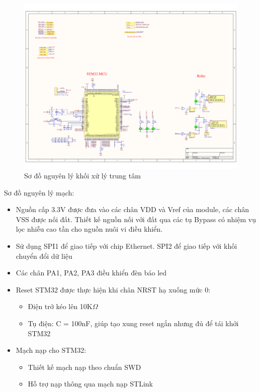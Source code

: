 \begin{figure}[!ht]
    \centering
    \includegraphics[width=1.0\linewidth]{Figures/Chap3_STM32-principle.pdf}
    \caption{Sơ đồ nguyên lý khối xử lý trung tâm}
    \label{fig:hinh3.5}
\end{figure}


\hspace{0.8cm} Sơ đồ nguyên lý mạch:

\begin{itemize}
    \item Nguồn cấp 3.3V được đưa vào các chân VDD và Vref của module, các chân VSS được nối đất. Thiết kế nguồn nối với đất qua các tụ Bypass có nhiệm vụ lọc nhiễu cao tần cho nguồn nuôi vi điều khiển.
    \item Sử dụng SPI1 để giao tiếp với chip Ethernet. SPI2 để giao tiếp với khối chuyển đổi dữ liệu
    \item Các chân PA1, PA2, PA3 điều khiển đèn báo led 
    \item Reset STM32 được thực hiện khi chân NRST hạ xuống mức 0:
    \begin{itemize}
        \item Điện trở kéo lên 10K$\Omega$
        \item Tụ điện: C = 100nF, giúp tạo xung reset ngắn nhưng đủ để tái khởi STM32
    \end{itemize}
    \item Mạch nạp cho STM32:
    \begin{itemize}
        \item Thiết kế mạch nạp theo chuẩn SWD
        \item Hỗ trợ nạp thông qua mạch nạp STLink
    \end{itemize}

\end{itemize}

